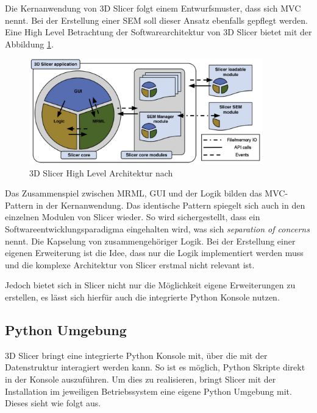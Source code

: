 Die Kernanwendung von 3D Slicer folgt einem Entwurfsmuster, dass sich \ac{MVC}
nennt. Bei der Erstellung einer \ac{SEM} soll dieser Ansatz ebenfalls gepflegt
werden. Eine High Level Betrachtung der Softwarearchitektur von 3D Slicer bietet
\cite[S.~25]{fedorov2012slicer} mit der Abbildung \ref{fig:3d_slicer_architektur}.

\begin{figure}[h]
	\centering
	\includegraphics[width=0.9\textwidth]{img/3d_slicer_architektur.jpg}
	\caption{3D Slicer High Level Architektur nach \citet[S.~25]{fedorov2012slicer}}
	\label{fig:3d_slicer_architektur}
\end{figure}

Das Zusammenspiel zwischen \ac{MRML}, \ac{GUI} und der Logik bilden das MVC-Pattern
in der Kernanwendung. Das identische Pattern spiegelt sich auch in den einzelnen
Modulen von Slicer wieder. So wird sichergestellt, dass ein
Softwareentwicklungsparadigma eingehalten wird, was sich \textit{separation of
concerns} nennt. Die Kapselung von zusammengehöriger Logik. Bei der Erstellung
einer eigenen Erweiterung ist die Idee, dass nur die Logik implementiert werden muss
und die komplexe Architektur von Slicer erstmal nicht relevant ist.

Jedoch bietet sich in Slicer nicht nur die Möglichkeit eigene Erweiterungen zu erstellen,
es lässt sich hierfür auch die integrierte Python Konsole nutzen.

\subsection{Python Umgebung}
\label{subsec:pythob_umgebung} 3D Slicer bringt eine integrierte Python Konsole
mit, über die mit der Datenstruktur interagiert werden kann. So ist es möglich, Python
Skripte direkt in der Konsole auszuführen. Um dies zu realisieren, bringt Slicer
mit der Installation im jeweiligen Betriebssystem eine eigene Python Umgebung mit.
Dieses sieht wie folgt aus.

